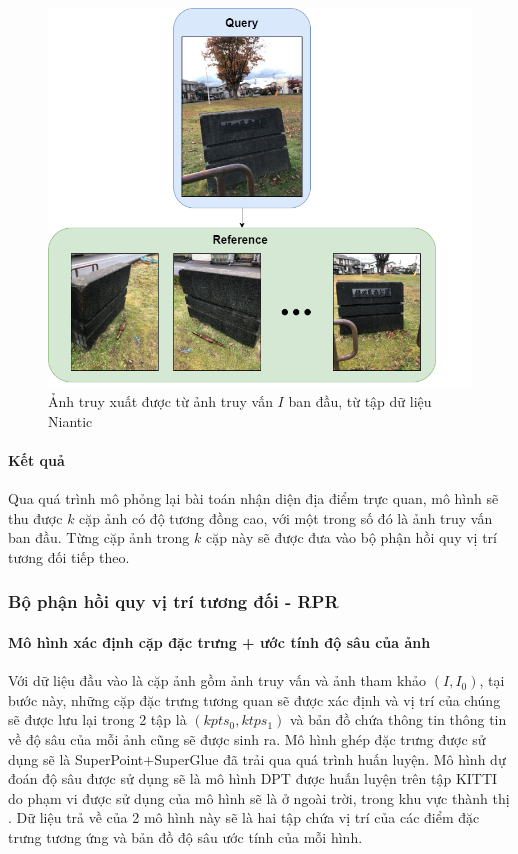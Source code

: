\begin{figure}[H]
    \centering
    \includegraphics[scale=0.5]{pics/Proposal/query.png}
    \caption[Kết quả của module VPR]{Ảnh truy xuất được từ ảnh truy vấn $I$ ban đầu, từ tập dữ liệu Niantic \cite{arnold2022mapfree}}
\end{figure}

\paragraph*{Kết quả}

Qua quá trình mô phỏng lại bài toán nhận diện địa điểm trực quan, mô hình sẽ thu được $k$ cặp ảnh có độ tương đồng cao, với một trong số đó là ảnh truy vấn ban đầu. Từng cặp ảnh trong $k$ cặp này sẽ được đưa vào bộ phận hồi quy vị trí tương đối tiếp theo.

\subsubsection{Bộ phận hồi quy vị trí tương đối - RPR}
\paragraph*{Mô hình xác định cặp đặc trưng + ước tính độ sâu của ảnh}

Với dữ liệu đầu vào là cặp ảnh gồm ảnh truy vấn và ảnh tham khảo $(I,I_0)$, tại bước này, những cặp đặc trưng tương quan sẽ được xác định và vị trí của chúng sẽ được lưu lại trong 2 tập là $(kpts_0,ktps_1)$ và bản đồ chứa thông tin thông tin về độ sâu của mỗi ảnh cũng sẽ được sinh ra. Mô hình ghép đặc trưng được sử dụng sẽ là SuperPoint+SuperGlue \cite{sarlin2020superglue} đã trải qua quá trình huấn luyện. Mô hình dự đoán độ sâu được sử dụng sẽ là mô hình DPT \cite{ranftl2021vision} được huấn luyện trên tập KITTI do phạm vi được sử dụng của mô hình sẽ là ở ngoài trời, trong khu vực thành thị \cite{arnold2022mapfree}. Dữ liệu trả về của 2 mô hình này sẽ là hai tập chứa vị trí của các điểm đặc trưng tương ứng và bản đồ độ sâu ước tính của mỗi hình.

